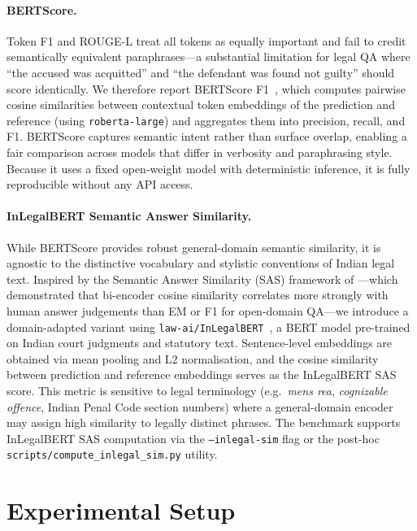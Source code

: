 \documentclass{article}
\begin{document}
\paragraph{BERTScore.}
Token F1 and ROUGE-L treat all tokens as equally important and fail to credit semantically equivalent paraphrases---a substantial limitation for legal QA where ``the accused was acquitted'' and ``the defendant was found not guilty'' should score identically. We therefore report BERTScore F1~\citep{bertscore}, which computes pairwise cosine similarities between contextual token embeddings of the prediction and reference (using \texttt{roberta-large}) and aggregates them into precision, recall, and F1. BERTScore captures semantic intent rather than surface overlap, enabling a fair comparison across models that differ in verbosity and paraphrasing style. Because it uses a fixed open-weight model with deterministic inference, it is fully reproducible without any API access.

\paragraph{InLegalBERT Semantic Answer Similarity.}
While BERTScore provides robust general-domain semantic similarity, it is agnostic to the distinctive vocabulary and stylistic conventions of Indian legal text. Inspired by the Semantic Answer Similarity (SAS) framework of \citet{risch2021sas}---which demonstrated that bi-encoder cosine similarity correlates more strongly with human answer judgements than EM or F1 for open-domain QA---we introduce a domain-adapted variant using \texttt{law-ai/InLegalBERT}~\citep{paul2023pretraining}, a BERT model pre-trained on Indian court judgments and statutory text. Sentence-level embeddings are obtained via mean pooling and L2 normalisation, and the cosine similarity between prediction and reference embeddings serves as the InLegalBERT SAS score. This metric is sensitive to legal terminology (e.g.\ \emph{mens rea}, \emph{cognizable offence}, Indian Penal Code section numbers) where a general-domain encoder may assign high similarity to legally distinct phrases. The benchmark supports InLegalBERT SAS computation via the \texttt{--inlegal-sim} flag or the post-hoc \texttt{scripts/compute\_inlegal\_sim.py} utility.

\section{Experimental Setup}
\end{document}
